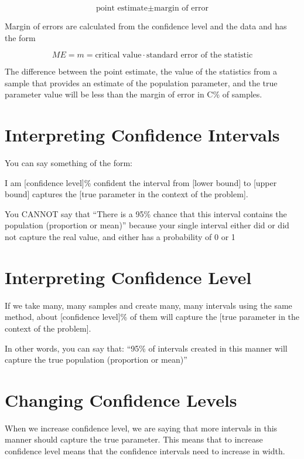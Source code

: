 \documentclass[
]{book}
\begin{document}
\[\text{point estimate} ± \text{margin of error}\]

Margin of errors are calculated from the confidence level and the data and has the form

\[ME = m = \text{critical value} \cdot \text{standard error of the statistic}\]

The difference between the point estimate, the value of the statistics from a sample that provides an estimate of the population parameter, and the true parameter value will be less than the margin of error in C\% of samples.

\hypertarget{interpreting-confidence-intervals}{%
\section{Interpreting Confidence Intervals}\label{interpreting-confidence-intervals}}

You can say something of the form:

I am {[}confidence level{]}\% confident the interval from {[}lower bound{]} to {[}upper bound{]} captures the {[}true parameter in the context of the problem{]}.

You CANNOT say that ``There is a 95\% chance that this interval contains the population (proportion or mean)'' because your single interval either did or did not capture the real value, and either has a probability of 0 or 1

\hypertarget{interpreting-confidence-level}{%
\section{Interpreting Confidence Level}\label{interpreting-confidence-level}}

If we take many, many samples and create many, many intervals using the same method, about {[}confidence level{]}\% of them will capture the {[}true parameter in the context of the problem{]}.

In other words, you can say that: ``95\% of intervals created in this manner will capture the true population (proportion or mean)''

\hypertarget{changing-confidence-levels}{%
\section{Changing Confidence Levels}\label{changing-confidence-levels}}

When we increase confidence level, we are saying that more intervals in this manner should capture the true parameter. This means that to increase confidence level means that the confidence intervals need to increase in width.
\end{document}
